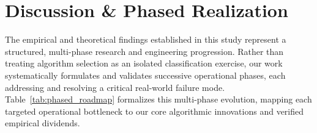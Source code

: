 \documentclass[journal]{IEEEtran}
\begin{document}
\begin{table}[!t]
\centering
\caption{Latency-Regret Pareto Frontier on Single-Core CPU}
\label{tab:latency_pareto}
\end{table}

\section{Discussion \& Phased Realization}
The empirical and theoretical findings established in this study represent a structured, multi-phase research and engineering progression. Rather than treating algorithm selection as an isolated classification exercise, our work systematically formulates and validates successive operational phases, each addressing and resolving a critical real-world failure mode. Table~\ref{tab:phased_roadmap} formalizes this multi-phase evolution, mapping each targeted operational bottleneck to our core algorithmic innovations and verified empirical dividends.
\end{document}
